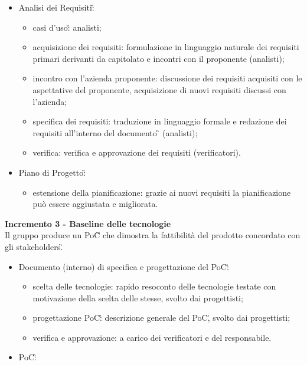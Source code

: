 {{    \begin{itemize}
        \item Analisi dei Requisiti\G:
            \begin{itemize}
                \item casi d'uso\G: analisti;
                \item acquisizione dei requisiti: formulazione in linguaggio naturale dei requisiti primari derivanti da capitolato e incontri con il proponente (analisti);
                \item incontro con l'azienda proponente: discussione dei requisiti acquisiti con le aspettative del proponente, acquisizione di nuovi requisiti discussi con l'azienda;
                \item specifica dei requisiti: traduzione in linguaggio formale e redazione dei requisiti all'interno del documento \AdR\G{} (analisti);
                \item verifica: verifica e approvazione dei requisiti (verificatori).
            \end{itemize}
    \item Piano di Progetto\G: 
        \begin{itemize}
            \item estensione della pianificazione: grazie ai nuovi requisiti la pianificazione può essere aggiustata e migliorata.
        \end{itemize} 
    \end{itemize}
    \textbf{Incremento 3 - Baseline delle tecnologie} \\
    Il gruppo produce un PoC\G{} che dimostra la fattibilità del prodotto concordato con gli stakeholders\G. \\
    \begin{itemize}
        \item Documento (interno) di specifica e progettazione del PoC\G:
            \begin{itemize}
                \item scelta delle tecnologie: rapido resoconto delle tecnologie testate con motivazione della scelta delle stesse, svolto dai progettisti;
                \item progettazione PoC\G: descrizione generale del PoC\G, svolto dai progettisti;
                \item verifica e approvazione: a carico dei verificatori e del responsabile.
            \end{itemize}
        \item PoC\G: 

\end{itemize}}}
